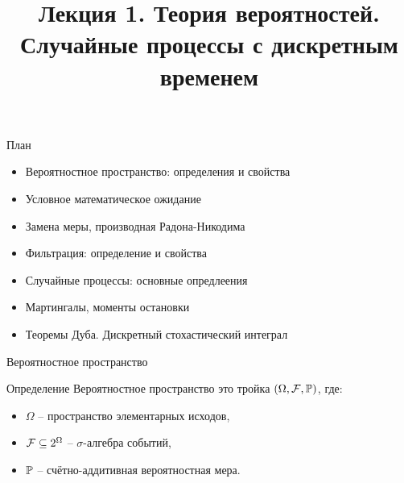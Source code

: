 \documentclass{beamer}
\title[Случайные процессы]{Лекция 1. Теория вероятностей. Случайные процессы с дискретным временем} %
\begin{document}
\begin{frame}
\titlepage 
\end{frame}

\begin{frame}{План}
    \begin{itemize}
        \item Вероятностное пространство: определения и свойства
        \item Условное математическое ожидание
        \item Замена меры, производная Радона-Никодима
        \item Фильтрация: определение и свойства
        \item Случайные процессы: основные опредлеения
        \item Мартингалы, моменты остановки
        \item Теоремы Дуба. Дискретный стохастический интеграл
    \end{itemize}
\end{frame}

\begin{frame}{Вероятностное пространство}
    \begin{block}{Определение}
        Вероятностное пространство это тройка $(\Omega, \mathcal{F}, \mathbb{P})$, где:
        \begin{itemize}
            \item $\Omega$ -- пространство элементарных исходов,
            \item $\mathcal{F} \subseteq 2^{\Omega}$ -- $\sigma$-алгебра событий,
            \item $\mathbb{P}$ -- счётно-аддитивная вероятностная мера.
        \end{itemize}
    \end{block}    
\end{frame}
\end{document}

